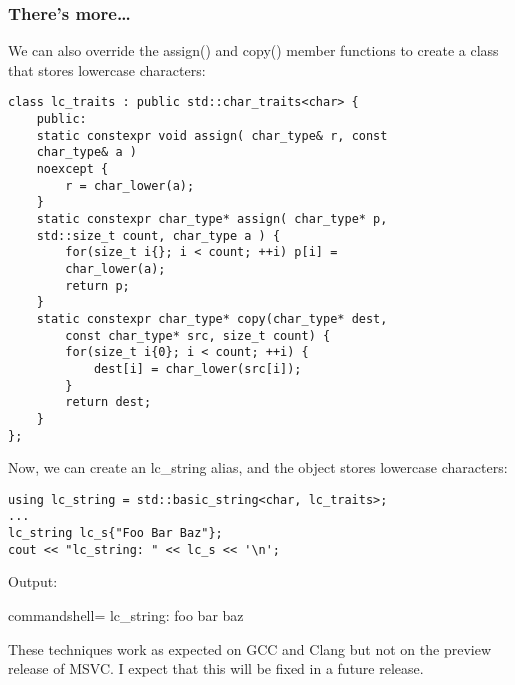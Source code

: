 \subsubsection{There's more…}

We can also override the assign() and copy() member functions to create a class that stores lowercase characters:

\begin{lstlisting}[style=styleCXX]
class lc_traits : public std::char_traits<char> {
	public:
	static constexpr void assign( char_type& r, const
	char_type& a )
	noexcept {
		r = char_lower(a);
	}
	static constexpr char_type* assign( char_type* p,
	std::size_t count, char_type a ) {
		for(size_t i{}; i < count; ++i) p[i] =
		char_lower(a);
		return p;
	}
	static constexpr char_type* copy(char_type* dest,
		const char_type* src, size_t count) {
		for(size_t i{0}; i < count; ++i) {
			dest[i] = char_lower(src[i]);
		}
		return dest;
	}
};
\end{lstlisting}

Now, we can create an lc\_string alias, and the object stores lowercase characters:

\begin{lstlisting}[style=styleCXX]
using lc_string = std::basic_string<char, lc_traits>;
...
lc_string lc_s{"Foo Bar Baz"};
cout << "lc_string: " << lc_s << '\n';
\end{lstlisting}

Output:

\begin{tcblisting}{commandshell={}}
lc_string: foo bar baz
\end{tcblisting}

\begin{tcolorbox}[colback=webgreen!5!white,colframe=webgreen!75!black,title=Note]
These techniques work as expected on GCC and Clang but not on the preview release of MSVC. I expect that this will be fixed in a future release.
\end{tcolorbox}



















